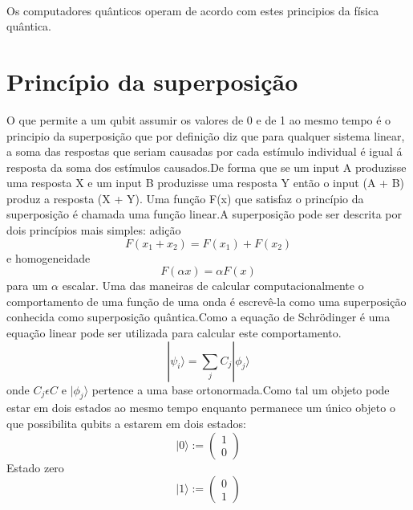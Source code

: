 \documentclass{report}
\begin{document}
\paragraph{}Os computadores quânticos operam de acordo com estes principios da física quântica.
\section{Princípio da superposição}
O que permite a um qubit assumir os valores de 0 e de 1 ao mesmo tempo é o principio da superposição que por definição diz que para qualquer sistema linear, a soma das respostas que seriam causadas por cada estímulo individual é igual á resposta da soma dos estímulos causados.De forma que se um input A produzisse uma resposta X e um input B produzisse uma resposta Y então o input (A + B) produz a resposta (X + Y).
Uma função F(x) que satisfaz o princípio da superposição é chamada uma função linear.A superposição pode ser descrita por dois princípios mais simples: adição
\begin{equation}
    F(x_1 + x_2) = F(x_1) + F(x_2)
\end{equation}
e homogeneidade
\begin{equation}
    F(\alpha x) = \alpha F(x)
\end{equation}
para um \(\alpha\) escalar.
Uma das maneiras de calcular computacionalmente o comportamento de uma função de uma onda é escrevê-la como uma superposição conhecida como superposição quântica.Como a equação de Schrödinger é uma equação linear pode ser utilizada para calcular este comportamento.
\begin{equation}
    |\psi_i\rangle = \sum_{j}C_j|\phi_j\rangle
\end{equation}
onde \(C_j \epsilon C\) e \(|\phi_j\rangle\) pertence a uma base ortonormada.Como tal um objeto pode estar em dois estados ao mesmo tempo enquanto permanece um único objeto o que possibilita qubits a estarem em dois estados:
\newline\begin{equation}
    |0\rangle:=\begin{pmatrix}1\\0\end{pmatrix}
\end{equation}
\newline Estado zero
\newline\begin{equation}
    |1\rangle := \begin{pmatrix}0\\1\end{pmatrix}
\end{equation}
\end{document}
